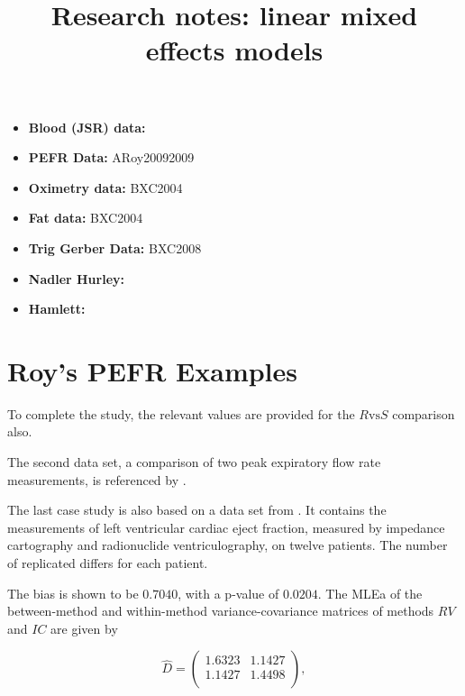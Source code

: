 \documentclass[12pt, a4paper]{report}
\title{Research notes: linear mixed effects models}
\author{ } \date{ }
\theoremstyle{plain}
\theoremstyle{definition}
\theoremstyle{remark}
\begin{document}
\begin{itemize}
\item \textbf{Blood (JSR) data:} 
\item \textbf{PEFR Data:} ARoy20092009
\item \textbf{Oximetry data:} BXC2004
\item \textbf{Fat data:} BXC2004
\item \textbf{Trig Gerber Data:} BXC2008
\item \textbf{Nadler Hurley:}
\item \textbf{Hamlett:}
\end{itemize}




\section{Roy's PEFR Examples}



To complete the study, the relevant values are provided for the $R \mbox{vs} S$ comparison also.


The second data set, a comparison of two peak expiratory flow rate measurements, is referenced by \citet{BA86}.


The last case study is also based on a data set from  \citet{BA99}. It contains the measurements of left ventricular cardiac eject fraction, measured by impedance cartography and radionuclide ventriculography, on twelve patients.
The number of replicated differs for each patient.

The bias is shown to be $0.7040$, with a p-value of $0.0204$. The MLEa of the between-method and within-method variance-covariance matrices of methods $RV$ and $IC$ are given by

\begin{equation}\hat{D}=\left(
\begin{array}{cc}
1.6323 & 1.1427 \\
1.1427 & 1.4498 \\
\end{array}
\right),
\end{equation}
\end{document}
